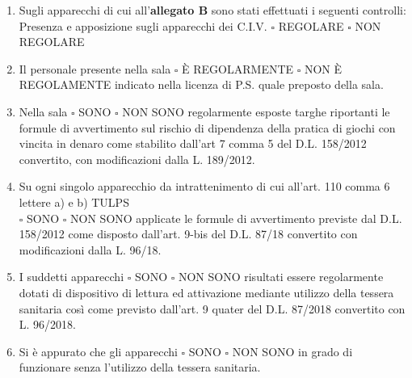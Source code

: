\documentclass[12pt]{article}
\begin{document}
\begin{enumerate}[resume]
    \item Sugli apparecchi di cui all’\textbf{allegato B} sono stati effettuati i seguenti controlli: \\
    Presenza e apposizione sugli apparecchi dei C.I.V. \begin{math}\square\end{math} REGOLARE \begin{math}\square\end{math} NON REGOLARE
    \item Il personale presente nella sala \begin{math}\square\end{math} È REGOLARMENTE \begin{math}\square\end{math} NON È REGOLAMENTE indicato nella licenza di P.S. quale preposto della sala.
    \item Nella sala \begin{math}\square\end{math} SONO \begin{math}\square\end{math} NON SONO regolarmente esposte targhe riportanti le formule di avvertimento sul rischio di dipendenza della pratica di giochi con vincita in denaro come stabilito dall’art 7 comma 5 del D.L. 158/2012 convertito, con modificazioni dalla L. 189/2012.
    \item Su ogni singolo apparecchio da intrattenimento di cui all’art. 110 comma 6 lettere a) e b) TULPS \\\begin{math}\square\end{math} SONO \begin{math}\square\end{math} NON SONO applicate le formule di avvertimento previste dal D.L. 158/2012 come disposto dall’art. 9-bis del D.L. 87/18 convertito con modificazioni dalla L. 96/18.
    \item I suddetti apparecchi \begin{math}\square\end{math} SONO \begin{math}\square\end{math} NON SONO risultati essere regolarmente dotati di dispositivo di lettura ed attivazione mediante utilizzo della tessera sanitaria così come previsto dall’art. 9 quater del D.L. 87/2018 convertito con L. 96/2018.
    \item Si è appurato che gli apparecchi \begin{math}\square\end{math} SONO \begin{math}\square\end{math} NON SONO in grado di funzionare senza l’utilizzo della tessera sanitaria.

\end{enumerate}
\end{document}
